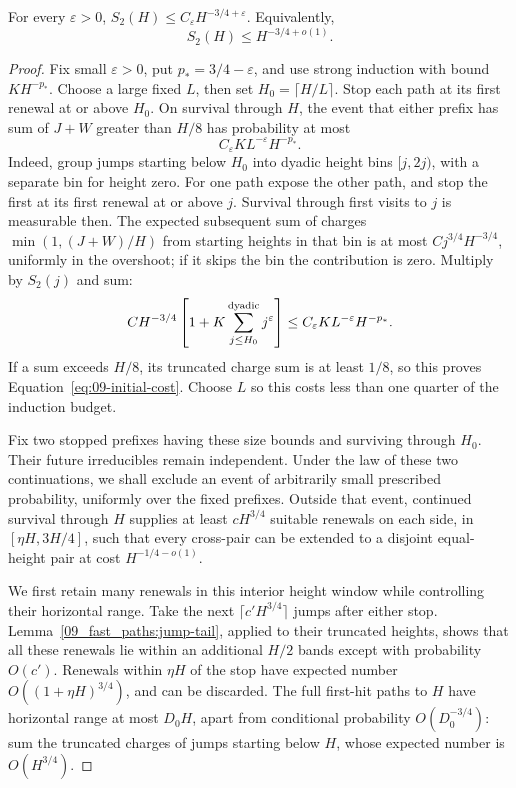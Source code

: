 \begin{theorem}\label{thm:asynchronous-avoidance}
For every \(\varepsilon>0\), \(S_2(H)\le C_\varepsilon
H^{-3/4+\varepsilon}\).  Equivalently,
\begin{equation}
                       S_2(H)\le H^{-3/4+o(1)}.
                 \label{eq:asynchronous-avoidance}
\end{equation}
\end{theorem}
\begin{proof}
Fix small \(\varepsilon>0\), put \(p_*=3/4-\varepsilon\), and
use strong induction with bound \(KH^{-p_*}\).  Choose a large fixed
\(L\), then set \(H_0=\lceil H/L\rceil\).  Stop each path at its
first renewal at or above \(H_0\).  On survival through \(H\), the
event that either prefix has sum of \(J+W\) greater than \(H/8\)
has probability at most
\begin{equation}
                      C_\varepsilon K L^{-\varepsilon}H^{-p_*}.
                                                     \label{eq:09-initial-cost}
\end{equation}
Indeed, group jumps starting below \(H_0\) into dyadic height bins
\([j,2j)\), with a separate bin for height zero.  For one path expose
the other path, and stop the first at its first renewal at or above
\(j\).  Survival through first visits to \(j\) is measurable then.
The expected subsequent sum of charges
\(\min(1,(J+W)/H)\) from starting heights in that bin is at most
\(Cj^{3/4}H^{-3/4}\), uniformly in the overshoot; if it skips the
bin the contribution is zero.  Multiply by \(S_2(j)\) and sum:
\[
 CH^{-3/4}\left[1+
       K\sum_{j\le H_0}^{\rm dyadic}j^\varepsilon\right]
                 \le C_\varepsilon K L^{-\varepsilon}H^{-p_*}.
\]
If a sum exceeds \(H/8\), its truncated charge sum is at least
\(1/8\), so this proves Equation~\eqref{eq:09-initial-cost}.
Choose \(L\) so this costs less than one quarter of the induction
budget.

Fix two stopped prefixes having these size bounds and surviving through
\(H_0\). Their future irreducibles remain independent. Under the law
of these two continuations, we shall exclude an event of arbitrarily
small prescribed probability, uniformly over the fixed prefixes.
Outside that event, continued survival through \(H\) supplies at least
\(cH^{3/4}\) suitable renewals on each side, in \([\eta H,3H/4]\),
such that every cross-pair can be extended to a disjoint equal-height
pair at cost \(H^{-1/4-o(1)}\).

We first retain many renewals in this interior height window while
controlling their horizontal range.
Take the next \(\lceil c'H^{3/4}\rceil\) jumps after either stop.
Lemma~\ref{09_fast_paths:jump-tail}, applied to their truncated heights,
shows that all these renewals lie within an additional \(H/2\) bands
except with probability \(O(c')\).  Renewals within \(\eta H\) of
the stop have expected number \(O((1+\eta H)^{3/4})\), and can be
discarded.  The full first-hit paths to \(H\) have horizontal range
at most \(D_0H\), apart from conditional probability
\(O(D_0^{-3/4})\): sum the truncated charges of jumps starting below
\(H\), whose expected number is \(O(H^{3/4})\).


\end{proof}
